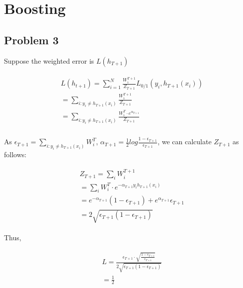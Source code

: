 \documentclass[10pt]{article}
\begin{document}
\section{Boosting}
\subsection{Problem 3}

Suppose the weighted error is $L(h_{T+1})$

\begin{equation}
\begin{aligned}
\begin{split}
& L(h_{t+1}) = \sum_{i=1}^{N}\frac{W_{i}^{T+1}}{Z_{T+1}}L_{0/1}(y_{i}, h_{T+1}(x_i)) \\
& = \sum_{i:y_i\neq h_{T+1}(x_i)}\frac{W_{i}^{T+1}}{Z_{T+1}} \\ 
& = \sum_{i:y_i\neq h_{T+1}(x_i)}\frac{W_{i}^{T}\cdot e^{\alpha_{T+1}}}{Z_{T+1}} \\
\end{split}
\end{aligned}
\end{equation}

As $\epsilon_{T+1}=\sum_{i:y_i\neq h_{T+1}(x_i)}W_{i}^{T}$, $\alpha_{T+1}=\frac{1}{2}log\frac{1-\epsilon_{T+1}}{\epsilon_{T+1}}$, we can calculate $Z_{T+1}$ as follows:

\begin{equation}
\begin{aligned}
\begin{split}
& Z_{T+1} = \sum_{i} W_{i}^{T+1} \\
& = \sum_{i}W_{i}^{T}\cdot e^{-\alpha_{T+1}y_{i}h_{T+1}(x_i)} \\
& = e^{-\alpha_{T+1}}(1-\epsilon_{T+1}) + e^{\alpha_{T+1}}\epsilon_{T+1} \\
& = 2\sqrt{\epsilon_{T+1}(1-\epsilon_{T+1})}
\end{split}
\end{aligned}
\end{equation}

Thus, 

\begin{equation}
\begin{aligned}
\begin{split}
& L = \frac{\epsilon_{T+1}\cdot \sqrt{\frac{1-\epsilon_{T+1}}{\epsilon_{T+1}}}}{2\sqrt{\epsilon_{T+1}(1-\epsilon_{T+1})}} \\
& = \frac{1}{2} \\
\end{split}
\end{aligned}
\end{equation}
\end{document}
